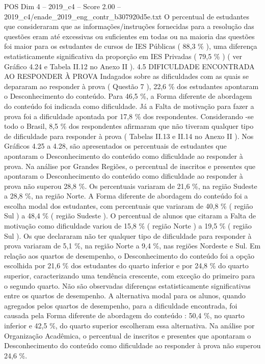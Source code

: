\begin{textsample}{POS Dim 4 – 2019\_c4 – Score 2.00 – 2019\_c4/enade\_2019\_eng\_contr\_b307920d5e.txt}
O percentual de estudantes que consideraram que as informações/instruções fornecidas para a resolução das questões eram até excessivas ou suficientes em todas ou na maioria das questões foi maior para os estudantes de cursos de IES Públicas ( 88,3 \% ), uma diferença estatisticamente significativa da proporção em IES Privadas ( 79,5 \% ) ( ver Gráfico 4.24 e Tabela II.12 no Anexo II ). 4.5 DIFICULDADE ENCONTRADA AO RESPONDER À PROVA Indagados sobre as dificuldades com as quais se depararam ao responder à prova ( Questão 7 ), 22,6 \% dos estudantes apontaram o Desconhecimento do conteúdo.
Para 46,5 \%, a Forma diferente de abordagem do conteúdo foi indicada como dificuldade.
Já a Falta de motivação para fazer a prova foi a dificuldade apontada por 17,8 \% dos respondentes.
Considerando -se todo o Brasil, 8,5 \% dos respondentes afirmaram que não tiveram qualquer tipo de dificuldade para responder à prova ( Tabelas II.13 e II.14 no Anexo II ).
Nos Gráficos 4.25 a 4.28, são apresentados os percentuais de estudantes que apontaram o Desconhecimento do conteúdo como dificuldade ao responder à prova.
Na análise por Grandes Regiões, o percentual de inscritos e presentes que apontaram o Desconhecimento do conteúdo como dificuldade ao responder à prova não superou 28,8 \%.
Os percentuais variaram de 21,6 \%, na região Sudeste a 28,8 \%, na região Norte.
A Forma diferente de abordagem do conteúdo foi a escolha modal dos estudantes, com percentuais que variaram de 40,8 \% ( região Sul ) a 48,4 \% ( região Sudeste ).
O percentual de alunos que citaram a Falta de motivação como dificuldade variou de 15,8 \% ( região Norte ) a 19,5 \% ( região Sul ).
Os que declararam não ter qualquer tipo de dificuldade para responder à prova variaram de 5,1 \%, na região Norte a 9,4 \%, nas regiões Nordeste e Sul.
Em relação aos quartos de desempenho, o Desconhecimento do conteúdo foi a opção escolhida por 21,6 \% dos estudantes do quarto inferior e por 24,8 \% do quarto superior, caracterizando uma tendência crescente, com exceção do primeiro para o segundo quarto.
Não são observadas diferenças estatisticamente significativas entre os quartos de desempenho.
A alternativa modal para os alunos, quando agregados pelos quartos de desempenho, para a dificuldade encontrada, foi causada pela Forma diferente de abordagem do conteúdo : 50,4 \%, no quarto inferior e 42,5 \%, do quarto superior escolheram essa alternativa.
Na análise por Organização Acadêmica, o percentual de inscritos e presentes que apontaram o Desconhecimento do conteúdo como dificuldade ao responder à prova não superou 24,6 \%.

\end{textsample}
